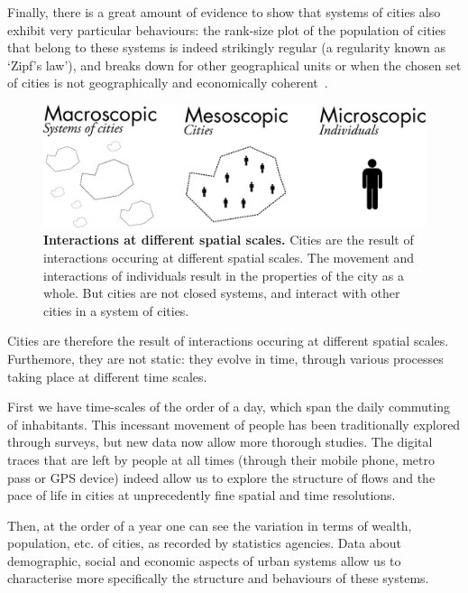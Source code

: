 Finally, there is a great amount of evidence to show that systems of cities also
exhibit very particular behaviours: the rank-size plot of the population of
cities that belong to these systems is indeed strikingly regular (a regularity
known as `Zipf's law'), and breaks down for other geographical units or when the
chosen set of cities is not geographically and economically
coherent~\cite{Cristelli:2012}.\\


\begin{figure}[!h]
    \centering
    \includegraphics[width=\textwidth]{./gfx/chapter-intro/spatial_scales.pdf}
    \caption{{\bf Interactions at different spatial scales.} Cities are the
    result of interactions occuring at different spatial scales. The movement
and interactions of individuals result in the properties of the city as a whole.
But cities are not closed systems, and interact with other cities in a system of
cities.\label{fig:spatialscale}}
\end{figure}


Cities are therefore the result of interactions occuring at different spatial
scales. Furthemore, they are not static: they evolve in time, through various
processes taking place at different time scales.

First we have time-scales of the order of a day, which span the daily commuting
of inhabitants. This incessant movement of people has been traditionally
explored through surveys, but new data now allow more thorough studies. The
digital traces that are left by people at all times (through their mobile phone,
metro pass or GPS device) indeed allow us to explore the structure of flows and
the pace of life in cities at unprecedently fine spatial and time resolutions.

Then, at the order of a year one can see the variation in terms of wealth,
population, etc. of cities, as recorded by statistics agencies. Data about
demographic, social and economic aspects of urban systems allow us to
characterise more specifically the structure and behaviours of these systems.

